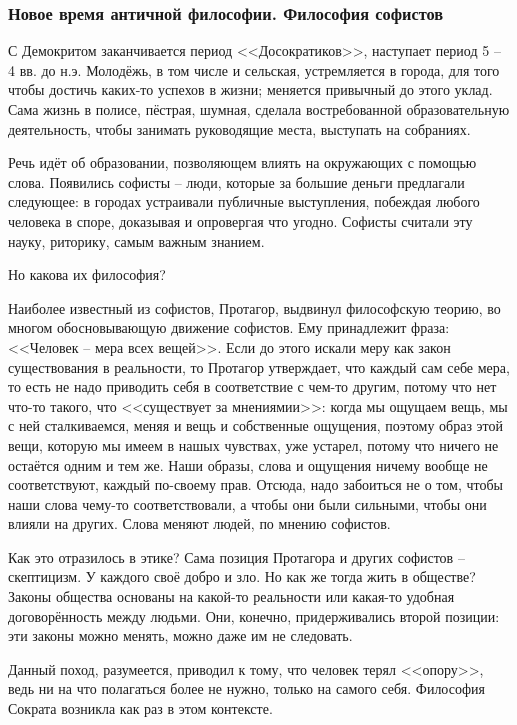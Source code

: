 \documentclass[a4paper, 12pt]{book} %
\begin{document}
\subsubsection{Новое время античной философии. Философия софистов}

С Демокритом заканчивается период <<Досократиков>>, наступает период 5 -- 4 вв. до н.э. Молодёжь, в том числе и сельская, устремляется в города, для того чтобы достичь каких-то успехов в жизни; меняется привычный до этого уклад. Сама жизнь в полисе, пёстрая, шумная, сделала востребованной образовательную деятельность, чтобы занимать руководящие места, выступать на собраниях.

Речь идёт об образовании, позволяющем влиять на окружающих с помощью слова. Появились софисты -- люди, которые за большие деньги предлагали следующее: в городах устраивали публичные выступления, побеждая любого человека в споре, доказывая и опровергая что угодно. Софисты считали эту науку, риторику, самым важным знанием.

Но какова их философия? 

Наиболее известный из софистов, Протагор, выдвинул философскую теорию, во многом обосновывающую движение софистов. Ему принадлежит фраза: <<Человек -- мера всех вещей>>. Если до этого искали меру как закон существования в реальности, то Протагор утверждает, что каждый сам себе мера, то есть не надо приводить себя в соответствие с чем-то другим, потому что нет что-то такого, что <<существует за мнениямии>>: когда мы ощущаем вещь, мы с ней сталкиваемся, меняя и вещь и собственные ощущения, поэтому образ этой вещи, которую мы имеем в нашых чувствах, уже устарел, потому что ничего не остаётся одним и тем же. Наши образы, слова и ощущения ничему вообще не соответствуют, каждый по-своему прав.
Отсюда, надо забоиться не о том, чтобы наши слова чему-то соответствовали, а чтобы они были сильными, чтобы они влияли на других. Слова меняют людей, по мнению софистов.

Как это отразилось в этике? Сама позиция Протагора и других софистов -- скептицизм. У каждого своё добро и зло. Но как же тогда жить в обществе? Законы общества основаны на какой-то реальности или какая-то удобная договорённость между людьми. Они, конечно, придерживались второй позиции: эти законы можно менять, можно даже им не следовать.

Данный поход, разумеется, приводил к тому, что человек терял <<опору>>, ведь ни на что полагаться более не нужно, только на самого себя. Философия Сократа возникла как раз в этом контексте.  
\end{document}
